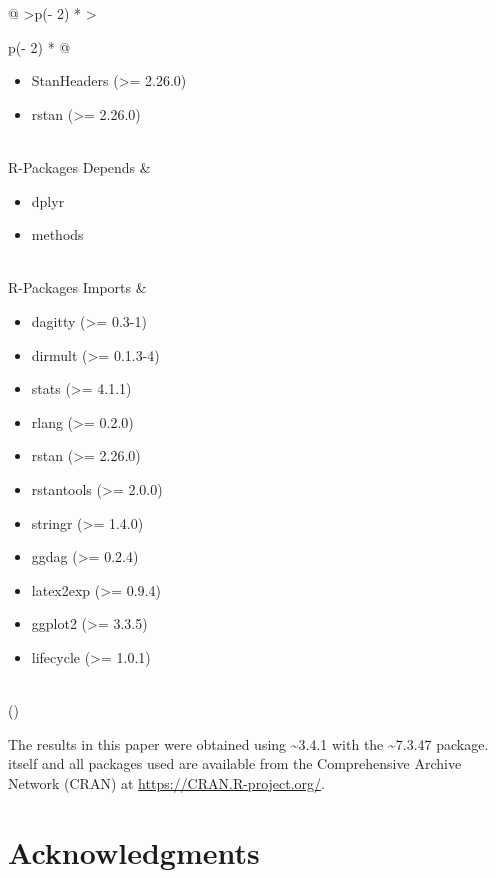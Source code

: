 \documentclass[
  11pt,
  article]{jss}
\providecommand{\tightlist}{%
  \setlength{\itemsep}{0pt}\setlength{\parskip}{0pt}}\usepackage{longtable,booktabs,array}
\begin{document}
\begin{longtable}[]{@{}
  >{\raggedleft\arraybackslash}p{(\columnwidth - 2\tabcolsep) * }
  >{\raggedright\arraybackslash}p{(\columnwidth - 2\tabcolsep) * }@{}}
\begin{minipage}[t]{\linewidth}
\begin{itemize}
  BH (\textgreater= 1.66.0)
\item
  StanHeaders (\textgreater= 2.26.0)
\item
  rstan (\textgreater= 2.26.0)
\end{itemize}
\end{minipage} \\
R-Packages Depends & \begin{minipage}[t]{\linewidth}\raggedright
\begin{itemize}
\tightlist
\item
  dplyr
\item
  methods
\end{itemize}
\end{minipage} \\
R-Packages Imports & \begin{minipage}[t]{\linewidth}\raggedright
\begin{itemize}
\tightlist
\item
  dagitty (\textgreater= 0.3-1)
\item
  dirmult (\textgreater= 0.1.3-4)
\item
  stats (\textgreater= 4.1.1)
\item
  rlang (\textgreater= 0.2.0)
\item
  rstan (\textgreater= 2.26.0)
\item
  rstantools (\textgreater= 2.0.0)
\item
  stringr (\textgreater= 1.4.0)
\item
  ggdag (\textgreater= 0.2.4)
\item
  latex2exp (\textgreater= 0.9.4)
\item
  ggplot2 (\textgreater= 3.3.5)
\item
  lifecycle (\textgreater= 1.0.1)
\end{itemize}
\end{minipage} \\
\bottomrule()
\end{longtable}

The results in this paper were obtained using
\textasciitilde3.4.1 with the
\textasciitilde7.3.47 package.  itself and all
packages used are available from the Comprehensive  Archive
Network (CRAN) at \url{https://CRAN.R-project.org/}.

\hypertarget{acknowledgments}{%
\section*{Acknowledgments}\label{acknowledgments}}
\end{document}
